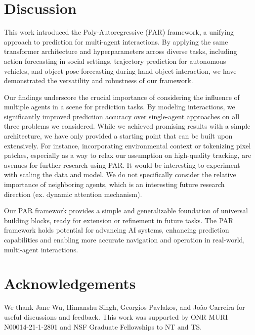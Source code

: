 \section{Discussion}

This work introduced the Poly-Autoregressive (PAR) framework, a unifying approach to prediction for multi-agent interactions. By applying the same transformer architecture and hyperparameters across diverse tasks, including action forecasting in social settings, trajectory prediction for autonomous vehicles, and object pose forecasting during hand-object interaction, we have demonstrated the versatility and robustness of our framework. 

Our findings underscore the crucial importance of considering the influence of multiple agents in a scene for prediction tasks. By modeling interactions, we significantly improved prediction accuracy over single-agent approaches on all three problems we considered. While we achieved promising results with a simple architecture, we have only provided a starting point that can be built upon extensively. For instance, incorporating environmental context or tokenizing pixel patches, especially as a way to relax our assumption on high-quality tracking,  are avenues for further research using PAR. It would be interesting to experiment with scaling the data and model. We do not specifically consider the relative importance of neighboring agents, which is an interesting future research direction (ex. dynamic attention mechanism).

Our PAR framework provides a simple and generalizable foundation of universal building blocks, ready for extension or refinement in future tasks. The PAR framework holds potential for advancing AI systems, enhancing prediction capabilities and enabling more accurate navigation and operation in real-world, multi-agent interactions.


\section{Acknowledgements} We thank Jane Wu, Himanshu Singh, Georgios Pavlakos, and João Carreira for useful discussions and feedback. This work was supported by ONR
MURI N00014-21-1-2801 and NSF Graduate Fellowships to NT and TS.